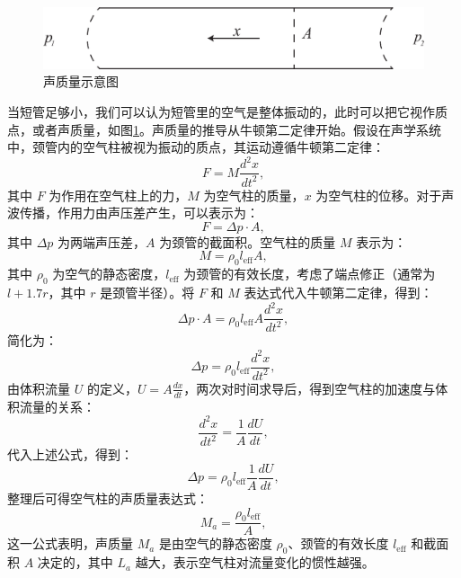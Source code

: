 \begin{figure}[h!]
  \centering
  \includegraphics[width=1\textwidth]{images/fig2-2.eps} 
  \caption{声质量示意图 }
  \label{fig_2_2}
\end{figure}

当短管足够小，我们可以认为短管里的空气是整体振动的，此时可以把它视作质点，或者声质量，如图\ref{fig_2_2}。声质量的推导从牛顿第二定律开始。假设在声学系统中，颈管内的空气柱被视为振动的质点，其运动遵循牛顿第二定律：
\begin{equation} \label{eq2-11}
  F = M \frac{d^2 x}{dt^2},
\end{equation}
其中 \( F \) 为作用在空气柱上的力，\( M \) 为空气柱的质量，\( x \) 为空气柱的位移。对于声波传播，作用力由声压差产生，可以表示为：
\begin{equation} \label{eq2-12}
  F = \Delta p \cdot A,
\end{equation}
其中 \( \Delta p \) 为两端声压差，\( A \) 为颈管的截面积。空气柱的质量 \( M \) 表示为：
\begin{equation} \label{eq2-13}
  M = \rho_0 l_{\text{eff}} A,
\end{equation}
其中 \( \rho_0 \) 为空气的静态密度，\( l_{\text{eff}} \) 为颈管的有效长度，考虑了端点修正（通常为 \( l + 1.7r \)，其中 \( r \) 是颈管半径）。将 \( F \) 和 \( M \) 表达式代入牛顿第二定律，得到：
\begin{equation} \label{eq2-14}
  \Delta p \cdot A = \rho_0 l_{\text{eff}} A \frac{d^2 x}{dt^2},
\end{equation}
简化为：
\begin{equation} \label{eq2-15}
  \Delta p = \rho_0 l_{\text{eff}} \frac{d^2 x}{dt^2},
\end{equation}
由体积流量 \( U \) 的定义，\( U = A \frac{dx}{dt} \)，两次对时间求导后，得到空气柱的加速度与体积流量的关系：
\begin{equation} \label{eq2-16}
  \frac{d^2 x}{dt^2} = \frac{1}{A} \frac{dU}{dt},
\end{equation}
代入上述公式，得到：
\begin{equation} \label{eq2-17}
  \Delta p = \rho_0 l_{\text{eff}} \frac{1}{A} \frac{dU}{dt},
\end{equation}
整理后可得空气柱的声质量表达式：
\begin{equation} \label{eq2-18}
  M_a = \frac{\rho_0 l_{\text{eff}}}{A},
\end{equation}
这一公式表明，声质量 \( M_a \) 是由空气的静态密度 \(\rho_0\)、颈管的有效长度 \(l_{\text{eff}}\) 和截面积 \(A\) 决定的，其中 \( L_a \) 越大，表示空气柱对流量变化的惯性越强。

